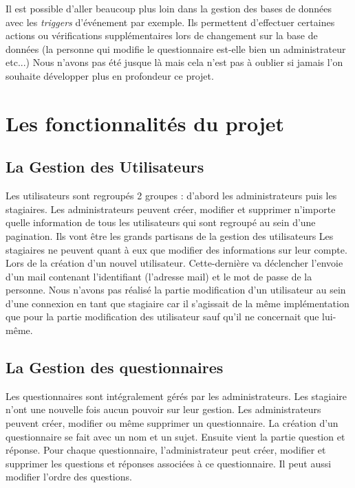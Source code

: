 \documentclass[a4paper]{article}
\begin{document}
Il est possible d'aller beaucoup plus loin dans la gestion des bases de données avec les \textit{triggers} d'événement par exemple. Ils permettent d'effectuer certaines actions ou vérifications supplémentaires lors de changement sur la base de données (la personne qui modifie le questionnaire est-elle bien un administrateur etc...) Nous n'avons pas été jusque là mais cela n'est pas à oublier si jamais l'on souhaite développer plus en profondeur ce projet.

\section{Les fonctionnalités du projet}

\subsection{La Gestion des Utilisateurs}

Les utilisateurs sont regroupés 2 groupes : d'abord les administrateurs puis les stagiaires. 
Les administrateurs peuvent créer, modifier et supprimer n’importe quelle information de tous les utilisateurs qui sont regroupé au sein d'une pagination. Ils vont être les grands partisans de la gestion des utilisateurs
Les stagiaires ne peuvent quant à eux que modifier des informations sur leur compte.
Lors de la création d’un nouvel utilisateur. Cette-dernière va déclencher l’envoie d’un mail contenant l'identifiant (l'adresse mail) et le mot de passe de la personne. 
Nous n'avons pas réalisé la partie modification d'un utilisateur au sein d'une connexion en tant que stagiaire car il s'agissait de la même implémentation que pour la partie modification des utilisateur sauf qu'il ne concernait que lui-même.

\subsection{La Gestion des questionnaires}

Les questionnaires sont intégralement gérés par les administrateurs. Les stagiaire n'ont une nouvelle fois aucun pouvoir sur leur gestion.
Les administrateurs peuvent créer, modifier ou même supprimer un questionnaire. 
La création d’un questionnaire se fait avec un nom et un sujet.  
Ensuite vient la partie question et réponse. Pour chaque questionnaire, l'administrateur peut créer, modifier et supprimer les questions et réponses associées à ce questionnaire. Il peut aussi modifier l'ordre des questions.
\end{document}
